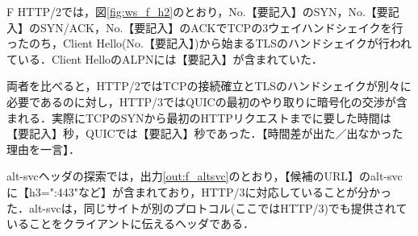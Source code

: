 \begin{maintask}{F}
  HTTP/2では，図\ref{fig:ws_f_h2}のとおり，No.【要記入】のSYN，No.【要記入】のSYN/ACK，No.【要記入】のACKでTCPの3ウェイハンドシェイクを行ったのち，Client Hello(No.【要記入】)から始まるTLSのハンドシェイクが行われている．Client HelloのALPNには【要記入】が含まれていた．

  両者を比べると，HTTP/2ではTCPの接続確立とTLSのハンドシェイクが別々に必要であるのに対し，HTTP/3ではQUICの最初のやり取りに暗号化の交渉が含まれる．実際にTCPのSYNから最初のHTTPリクエストまでに要した時間は【要記入】秒，QUICでは【要記入】秒であった．【時間差が出た／出なかった理由を一言】．

  alt-svcヘッダの探索では，出力\ref{out:f_altsvc}のとおり，【候補のURL】のalt-svcに【h3=":443"など】が含まれており，HTTP/3に対応していることが分かった．alt-svcは，同じサイトが別のプロトコル(ここではHTTP/3)でも提供されていることをクライアントに伝えるヘッダである．
\end{maintask}
